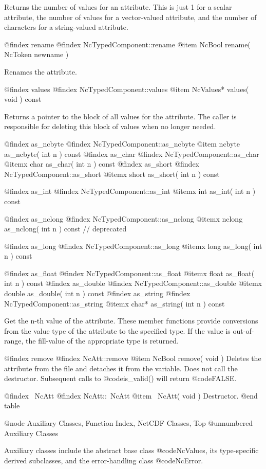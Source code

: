 Returns the number of values for an attribute.  This is just 1 for a
scalar attribute, the number of values for a vector-valued attribute,
and the number of characters for a string-valued attribute.

@findex rename
@findex NcTypedComponent::rename
@item NcBool rename( NcToken newname )

Renames the attribute.

@findex values
@findex NcTypedComponent::values
@item NcValues* values( void ) const

Returns a pointer to the block of all values for the
attribute.  The caller is responsible for deleting this block of values
when no longer needed.

@findex as_ncbyte
@findex NcTypedComponent::as_ncbyte
@item ncbyte as_ncbyte( int n ) const
@findex as_char
@findex NcTypedComponent::as_char
@itemx char as_char( int n ) const
@findex as_short
@findex NcTypedComponent::as_short
@itemx short as_short( int n ) const

@findex as_int
@findex NcTypedComponent::as_int
@itemx int as_int( int n ) const

@findex as_nclong
@findex NcTypedComponent::as_nclong
@itemx nclong as_nclong( int n ) const // deprecated

@findex as_long
@findex NcTypedComponent::as_long
@itemx long as_long( int n ) const

@findex as_float
@findex NcTypedComponent::as_float
@itemx float as_float( int n ) const
@findex as_double
@findex NcTypedComponent::as_double
@itemx double as_double( int n ) const
@findex as_string
@findex NcTypedComponent::as_string
@itemx char* as_string( int n ) const

Get the n-th value of the attribute.  These member functions provide
conversions from the value type of the attribute to the specified type.
If the value is out-of-range, the fill-value of the appropriate type is
returned.

@findex remove
@findex NcAtt::remove
@item NcBool remove( void )
Deletes the attribute from the file and detaches it from the variable.
Does not call the destructor.  Subsequent calls to @code{is_valid()} will
return @code{FALSE}.

@findex ~NcAtt
@findex NcAtt::~NcAtt
@item ~NcAtt( void )
Destructor.
@end table

@node Auxiliary Classes, Function Index, NetCDF Classes, Top
@unnumbered  Auxiliary Classes

Auxiliary classes include the abstract base class @code{NcValues}, its
type-specific derived subclasses, and the error-handling class
@code{NcError}.

